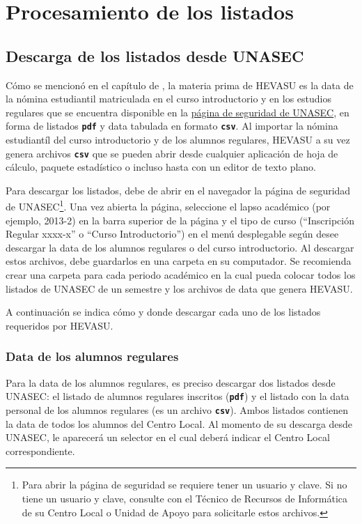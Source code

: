 \documentclass[letterpaper,12pt]{book}
\newcommand{\fileformat}[1]{\textbf{\texttt{#1}}}
\begin{document}
\chapter{Procesamiento de los listados}\label{cap:archivos}

\section{Descarga de los listados desde UNASEC}\label{sec:descarga_listados}
Cómo se mencionó en el capítulo de , la materia prima de HEVASU es la data de la nómina estudiantil matriculada en el curso introductorio y en los estudios regulares que se encuentra disponible en la \href{https://www.unasec.com}{página de seguridad de UNASEC}, en forma de listados \fileformat{pdf} y data tabulada en formato \fileformat{csv}. Al importar la nómina estudiantíl del curso introductorio y de los alumnos regulares, HEVASU a su vez genera archivos \fileformat{csv} que se pueden abrir desde cualquier aplicación de hoja de cálculo, paquete estadístico o incluso hasta con un editor de texto plano.

Para descargar los listados, debe de abrir en el navegador la página de seguridad de UNASEC\footnote{Para abrir la página de seguridad se requiere tener un usuario y clave. Si no tiene un usuario y clave, consulte con el Técnico de Recursos de Informática de su Centro Local o Unidad de Apoyo para solicitarle estos archivos.}. Una vez abierta la página, seleccione el lapso académico (por ejemplo, 2013-2) en la barra superior de la página y el tipo de curso (``Inscripción Regular xxxx-x'' o ``Curso Introductorio'') en el menú desplegable según desee descargar la data de los alumnos regulares o del curso introductorio. Al descargar estos archivos, debe guardarlos en una carpeta en su computador. Se recomienda crear una carpeta para cada periodo académico en la cual pueda colocar todos los listados de UNASEC de un semestre y los archivos de data que genera HEVASU.

A continuación se indica cómo y donde descargar cada uno de los listados requeridos por HEVASU.

\subsection{Data de los alumnos regulares}\label{subsec:data_regulares}
Para la data de los alumnos regulares, es preciso descargar dos listados desde UNASEC: el listado de alumnos regulares inscritos (\fileformat{pdf}) y el listado con la data personal de los alumnos regulares (es un archivo \fileformat{csv}). Ambos listados contienen la data de todos los alumnos del Centro Local. Al momento de su descarga desde UNASEC, le aparecerá un selector en el cual deberá indicar el Centro Local correspondiente.
\end{document}
